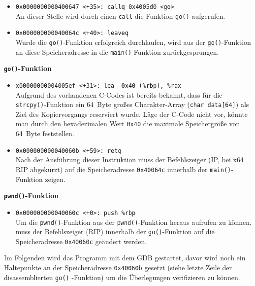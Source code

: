 \begin{itemize}
      \item \texttt{0x0000000000400647 <+35>:    callq  0x4005d0 <go>}\\
        An dieser Stelle wird durch einen \texttt{call} die Funktion \texttt{go()} aufgerufen.
      \item \texttt{0x000000000040064c <+40>:    leaveq}\\
        Wurde die \texttt{go()}-Funktion erfolgreich durchlaufen, wird aus der \texttt{go()}-Funktion an diese Speicheradresse in die \texttt{main()}-Funktion zurückgesprungen.       
\end{itemize}
\textbf{\texttt{go()}-Funktion}

\begin{itemize}
      \item \texttt{x00000000004005ef <+31>:    lea    -0x40	(\%rbp), \%rax}\\
        Aufgrund des vorhandenen C-Codes ist bereits bekannt, dass für die \texttt{strcpy()}-Funktion ein \SI{64}{Byte} großes Charakter-Array (\texttt{char data[64]}) als Ziel des Kopiervorgangs reserviert wurde. Läge der C-Code nicht vor, könnte man durch den hexadezimalen Wert \texttt{0x40} die maximale Speichergröße von \SI{64}{Byte} feststellen.        
      \item \texttt{0x000000000040060b <+59>:    retq}\\
        Nach der Ausführung dieser Instruktion muss der Befehlszeiger (IP, bei x64 RIP abgekürzt) auf die Speicheradresse \texttt{0x40064c} innerhalb der \texttt{main()}-Funktion zeigen.
\end{itemize}



\textbf{\texttt{pwnd()}-Funktion}

\begin{itemize}
      \item \texttt{0x000000000040060c <+0>:     push   \%rbp}\\
        Um die \texttt{pwnd()}-Funktion aus der \texttt{pwnd()}-Funktion heraus aufrufen zu können, muss der Befehlszeiger (RIP) innerhalb der \texttt{go()}-Funktion auf die Speicheradresse \texttt{0x40060c} geändert werden. 
\end{itemize}

\newpage
Im Folgenden wird das Programm mit dem GDB gestartet, davor wird noch ein 
Haltepunkte an der Speicheradresse \texttt{0x40060b} gesetzt (siehe 
letzte Zeile der disassemblierten \texttt{go()} -Funktion) um die 
Überlegungen verifizieren zu können.
        
